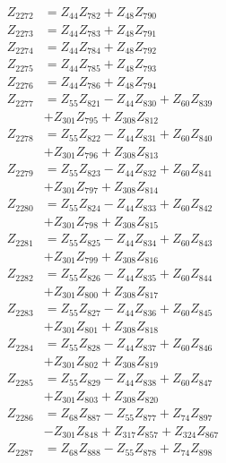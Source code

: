 \begin{multicols}{2}
\begin{align}
Z_{2272} &= Z_{44}Z_{782} + Z_{48}Z_{790} \nonumber \\
Z_{2273} &= Z_{44}Z_{783} + Z_{48}Z_{791} \nonumber \\
Z_{2274} &= Z_{44}Z_{784} + Z_{48}Z_{792} \nonumber \\
Z_{2275} &= Z_{44}Z_{785} + Z_{48}Z_{793} \nonumber \\
Z_{2276} &= Z_{44}Z_{786} + Z_{48}Z_{794} \nonumber \\
Z_{2277} &= Z_{55}Z_{821} - Z_{44}Z_{830} + Z_{60}Z_{839}  \nonumber \\
&+ Z_{301}Z_{795} + Z_{308}Z_{812} \nonumber \\
Z_{2278} &= Z_{55}Z_{822} - Z_{44}Z_{831} + Z_{60}Z_{840}  \nonumber \\
&+ Z_{301}Z_{796} + Z_{308}Z_{813} \nonumber \\
Z_{2279} &= Z_{55}Z_{823} - Z_{44}Z_{832} + Z_{60}Z_{841}  \nonumber \\
&+ Z_{301}Z_{797} + Z_{308}Z_{814} \nonumber \\
Z_{2280} &= Z_{55}Z_{824} - Z_{44}Z_{833} + Z_{60}Z_{842}  \nonumber \\
&+ Z_{301}Z_{798} + Z_{308}Z_{815} \nonumber \\
Z_{2281} &= Z_{55}Z_{825} - Z_{44}Z_{834} + Z_{60}Z_{843}  \nonumber \\
&+ Z_{301}Z_{799} + Z_{308}Z_{816} \nonumber \\
Z_{2282} &= Z_{55}Z_{826} - Z_{44}Z_{835} + Z_{60}Z_{844}  \nonumber \\
&+ Z_{301}Z_{800} + Z_{308}Z_{817} \nonumber \\
Z_{2283} &= Z_{55}Z_{827} - Z_{44}Z_{836} + Z_{60}Z_{845}  \nonumber \\
&+ Z_{301}Z_{801} + Z_{308}Z_{818} \nonumber \\
Z_{2284} &= Z_{55}Z_{828} - Z_{44}Z_{837} + Z_{60}Z_{846}  \nonumber \\
&+ Z_{301}Z_{802} + Z_{308}Z_{819} \nonumber \\
Z_{2285} &= Z_{55}Z_{829} - Z_{44}Z_{838} + Z_{60}Z_{847}  \nonumber \\
&+ Z_{301}Z_{803} + Z_{308}Z_{820} \nonumber \\
Z_{2286} &= Z_{68}Z_{887} - Z_{55}Z_{877} + Z_{74}Z_{897}  \nonumber \\
&- Z_{301}Z_{848} + Z_{317}Z_{857} + Z_{324}Z_{867} \nonumber \\
Z_{2287} &= Z_{68}Z_{888} - Z_{55}Z_{878} + Z_{74}Z_{898}  \nonumber \\

\end{align}
\end{multicols}
